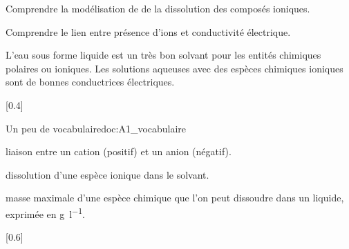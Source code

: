 \teteTermStssEnvi

\vspace*{-36pt}


\begin{objectifs}
  \item Comprendre la modélisation de de la dissolution des composés ioniques.
  \item Comprendre le lien entre présence d'ions et conductivité électrique.
\end{objectifs}

\begin{contexte}
  L'eau sous forme liquide est un très bon solvant pour les entités chimiques polaires ou ioniques.
  Les solutions aqueuses avec des espèces chimiques ioniques sont de bonnes conductrices électriques.
  
\end{contexte}


[0.4]{
  \begin{doc}{Un peu de vocabulaire}{doc:A1_vocabulaire}
    \begin{importants}
      \pointCyan {}
      liaison entre un cation (positif) et un anion (négatif).
      
      \pointCyan {}
      dissolution d'une espèce ionique dans le solvant.
      
      \pointCyan {}
      masse maximale d'une espèce chimique que l'on peut dissoudre dans un liquide, exprimée en \unit{\g\per\litre}.
    \end{importants}
  \end{doc}
}[0.6]

